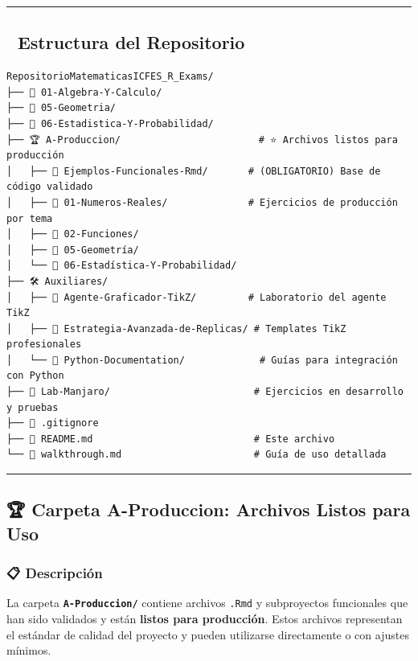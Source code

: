 \documentclass[
]{article}
\begin{document}
\begin{center}\rule{0.5\linewidth}{0.5pt}\end{center}

\subsection{\texorpdfstring{📁 \textbf{Estructura del
Repositorio}}{📁 Estructura del Repositorio}}\label{estructura-del-repositorio}

\begin{verbatim}
RepositorioMatematicasICFES_R_Exams/
├── 📂 01-Algebra-Y-Calculo/
├── 📂 05-Geometria/
├── 📂 06-Estadistica-Y-Probabilidad/
├── 🏆 A-Produccion/                        # ⭐ Archivos listos para producción
│   ├── 📂 Ejemplos-Funcionales-Rmd/       # (OBLIGATORIO) Base de código validado
│   ├── 📂 01-Numeros-Reales/              # Ejercicios de producción por tema
│   ├── 📂 02-Funciones/
│   ├── 📂 05-Geometría/
│   └── 📂 06-Estadística-Y-Probabilidad/
├── 🛠️ Auxiliares/
│   ├── 📂 Agente-Graficador-TikZ/         # Laboratorio del agente TikZ
│   ├── 📂 Estrategia-Avanzada-de-Replicas/ # Templates TikZ profesionales
│   └── 📂 Python-Documentation/             # Guías para integración con Python
├── 🧪 Lab-Manjaro/                         # Ejercicios en desarrollo y pruebas
├── 📄 .gitignore
├── 📖 README.md                            # Este archivo
└── 📖 walkthrough.md                       # Guía de uso detallada
\end{verbatim}

\begin{center}\rule{0.5\linewidth}{0.5pt}\end{center}

\subsection{\texorpdfstring{🏆 \textbf{Carpeta A-Produccion: Archivos
Listos para
Uso}}{🏆 Carpeta A-Produccion: Archivos Listos para Uso}}\label{carpeta-a-produccion-archivos-listos-para-uso}

\subsubsection{\texorpdfstring{📋
\textbf{Descripción}}{📋 Descripción}}\label{descripciuxf3n}

La carpeta \textbf{\texttt{A-Produccion/}} contiene archivos
\texttt{.Rmd} y subproyectos funcionales que han sido validados y están
\textbf{listos para producción}. Estos archivos representan el estándar
de calidad del proyecto y pueden utilizarse directamente o con ajustes
mínimos.
\end{document}
